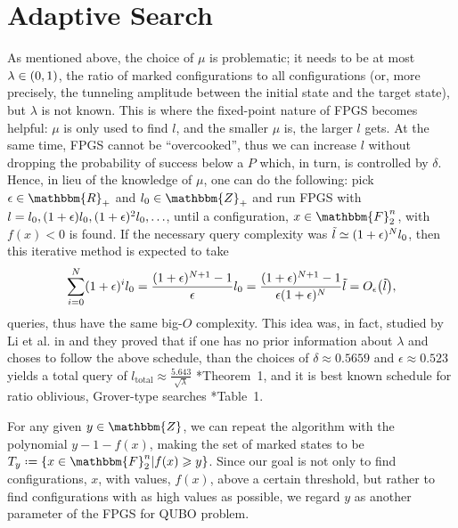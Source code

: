 \documentclass[reqno, 10pt]{amsart}
\numberwithin{equation}{section}                     %
\let\originalleft\left
\let\originalright\right
\renewcommand{\left}{\mathopen{}\mathclose\bgroup\originalleft}
\renewcommand{\right}{\aftergroup\egroup\originalright}
\def\({\mathopen{}\left(}
\def\){\right)\mathclose{}}
\newcommand*{\eqdef}{\mathrel{\vcenter{\baselineskip0.5ex \lineskiplimit0pt\hbox{.}\hbox{.}}}=}
\def\F{\mathbbm{F}}
\def\rl{\mathbbm{R}}
\def\Z{\mathbbm{Z}}
\begin{document}
\bigskip

\section{Adaptive Search}
\label{sec:adaptive}

As mentioned above, the choice of $\mu$ is problematic; it needs to be at most $\lambda \in \( 0, 1 \)$, the ratio of marked configurations to all configurations (or, more precisely, the tunneling amplitude between the initial state and the target state), but $\lambda$ is not known. This is where the fixed-point nature of FPGS becomes helpful: $\mu$ is only used to find $l$, and the smaller $\mu$ is, the larger $l$ gets. At the same time, FPGS cannot be ``overcooked'', thus we can increase $l$ without dropping the probability of success below a $P$ which, in turn, is controlled by $\delta$. Hence, in lieu of the knowledge of $\mu$, one can do the following: pick $\epsilon \in \rl_+$ and $l_0 \in \Z_+$ and run FPGS with $l = l_0, \( 1 + \epsilon \) l_0, \( 1 + \epsilon \)^2 l_0, \ldots$, until a configuration, $x \in \F_2^n$, with $f(x) < 0$ is found. If the necessary query complexity was $\tilde{l} \simeq \( 1 + \epsilon \)^N l_0$, then this iterative method is expected to take
\begin{equation}
     \sum_{i = 0}^N \( 1 + \epsilon \)^i l_0 = \frac{\( 1 + \epsilon \)^{N + 1} - 1}{\epsilon} l_0 = \frac{\( 1 + \epsilon \)^{N + 1} - 1}{\epsilon \( 1 + \epsilon \)^N} \tilde{l} = O_\epsilon \( \tilde{l} \),
\end{equation}
queries, thus have the same big-$O$ complexity. This idea was, in fact, studied by Li et al. in \cite{li_quantum_2019} and they proved that if one has no prior information about $\lambda$ and choses to follow the above schedule, than the choices of $\delta \approx 0.5659$ and $\epsilon \approx 0.523$ yields a total query of $l_{\mathrm{total}} \approx \tfrac{5.643}{\sqrt{\lambda}}$ \cite{li_quantum_2019}*{Theorem~1}, and it is best known schedule for ratio oblivious, Grover-type searches \cite{li_quantum_2019}*{Table~1}.

For any given $y \in \Z$, we can repeat the algorithm with the polynomial $y - 1 - f(x)$, making the set of marked states to be $T_y \eqdef \{ x \in \F_2^n | f(x) \geqslant y \}$. Since our goal is not only to find configurations, $x$, with values, $f(x)$, above a certain threshold, but rather to find configurations with as high values as possible, we regard $y$ as another parameter of the FPGS for QUBO problem.
\end{document}
